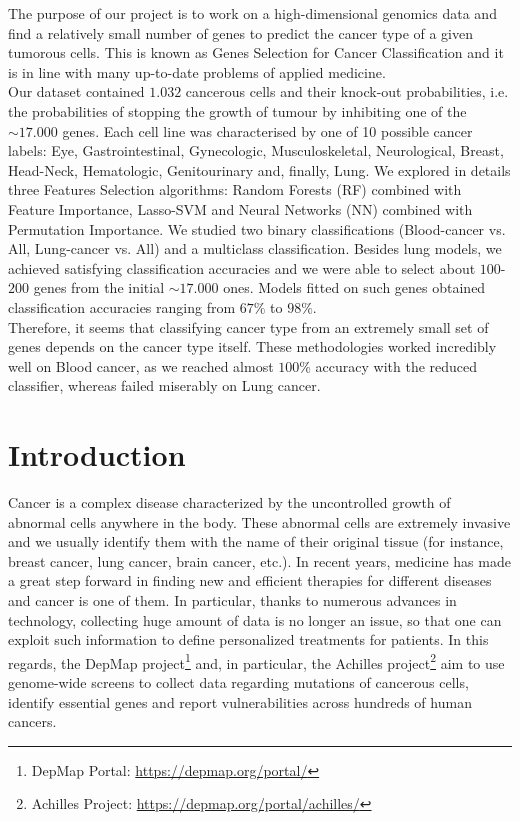 \documentclass[a4paper,11pt, oneside]{article}  %
\begin{document}
The purpose of our project is to work on a high-dimensional genomics data and find a relatively small number of genes to predict the cancer type of a given tumorous cells. This is known as Genes Selection for Cancer Classification and it is in line with many up-to-date problems of applied medicine. \\
Our dataset contained $1.032$ cancerous cells and their knock-out probabilities, i.e. the probabilities of stopping the growth of tumour by inhibiting one of the $\sim 17.000$ genes. Each cell line was characterised by one of 10 possible cancer labels: Eye, Gastrointestinal, Gynecologic, Musculoskeletal, Neurological, Breast, Head-Neck, Hematologic, Genitourinary and, finally, Lung. We explored in details three Features Selection algorithms: Random Forests (RF) combined with Feature Importance, Lasso-SVM and Neural Networks (NN) combined with Permutation Importance. We studied two binary classifications (Blood-cancer vs. All, Lung-cancer vs. All) and a multiclass classification. Besides lung models, we achieved satisfying classification accuracies and we were able to select about $100$-$200$ genes from the initial $\sim 17.000$ ones. Models fitted on such genes obtained classification accuracies ranging from $67\%$ to $98\%$. \\
Therefore, it seems that classifying cancer type from an extremely small set of genes depends on the cancer type itself. These methodologies worked incredibly well on Blood cancer, as we reached almost $100\%$ accuracy with the reduced classifier, whereas failed miserably on Lung cancer.  


\section{Introduction}
Cancer is a complex disease characterized by the uncontrolled growth of abnormal cells anywhere in the body. These abnormal cells are extremely invasive and we usually identify them with the name of their original tissue (for instance, breast cancer, lung cancer,  brain cancer, etc.).  In recent years, medicine has made a great step forward in finding new and efficient therapies for different diseases and cancer is one of them.  In particular,  thanks to numerous advances in technology,  collecting huge amount of data is no longer an issue, so that one can exploit such information to define personalized treatments for patients. In this regards, the DepMap project\footnote{DepMap Portal: \url{https://depmap.org/portal/} } and,  in particular,  the Achilles project\footnote{Achilles Project: \url{https://depmap.org/portal/achilles/} } aim to use genome-wide screens to collect data regarding mutations of cancerous cells,  identify essential genes and report vulnerabilities across hundreds of human cancers.  \\
 
\end{document}
